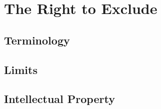 \chapter{The Right to Exclude}





\begin{questions}

\end{questions}

\section{Terminology}





\section{Limits}





\begin{questions}

    \replaceend{\expectnext}{}
\endedit


\end{questions}

%
%
%
%


\section{Intellectual Property}


%
%
%




\begin{questions}

\end{questions}


